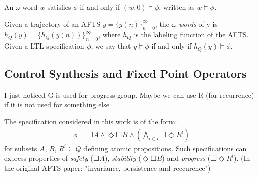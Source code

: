An $\omega$-word $ w $ satisfies $ \phi $ if and only if $ (w,0)\models \phi $, written as $ w \models \phi $. 

Given a trajectory of an AFTS $ y = \{y(n)\}_{n=0}^{\infty} $, the \textit{$\omega$-words} of y is $ h_Q(y) =  \{h_Q(y(n))\}_{n=0}^{\infty} $, where $ h_Q $ is the labeling function of the AFTS.  Given a LTL specification $ \phi $, we say that $ y\models \phi $ if and only if $ h_Q(y) \models \phi $.

\subsection{Control Synthesis and Fixed Point Operators}
\label{sec: cont_syn}

{\color{blue}I just noticed G is used for progress group. Maybe we can use R (for recurrence) if it is not used for something else}

The specification considered in this work is of the form:
\begin{align}
\phi = \Square A \wedge \Diamond \Square B \wedge \left( \bigwedge_{i\in I} \Square \Diamond R^i\right)\label{phi}
\end{align}
{\color{purple} for subsets $A$, $B$, $R^i \subseteq Q$ defining atomic propositions. Such specifications can express properties of \emph{safety} ($\Square A$), \emph{stability} ($\Diamond \Square B$) and \emph{progress} ($\Square \Diamond R^i$). (In the original AFTS paper: "invariance, persistence and reccurence")}

